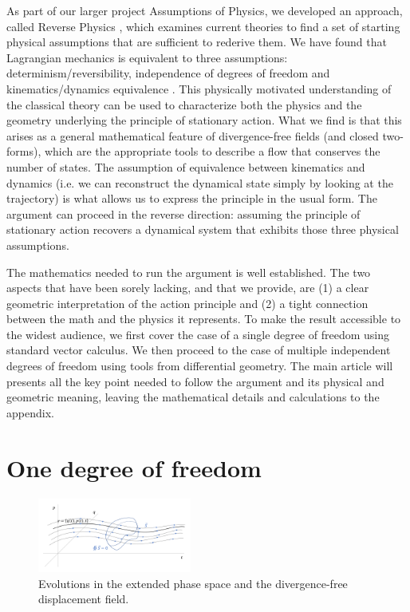 \documentclass[10pt,twocolumn, nofootinbib]{revtex4-2}
\begin{document}
As part of our larger project Assumptions of Physics, we developed an approach, called Reverse Physics \cite{aop-phys-ReversePhysics}, which examines current theories to find a set of starting physical assumptions that are sufficient to rederive them. We have found that Lagrangian mechanics is equivalent to three assumptions: determinism/reversibility, independence of degrees of freedom and kinematics/dynamics equivalence \cite{aop-phys-blueprint}. This physically motivated understanding of the classical theory can be used to characterize both the physics and the geometry underlying the principle of stationary action. What we find is that this arises as a general mathematical feature of divergence-free fields (and closed two-forms), which are the appropriate tools to describe a flow that conserves the number of states. The assumption of equivalence between kinematics and dynamics (i.e. we can reconstruct the dynamical state simply by looking at the trajectory) is what allows us to express the principle in the usual form. The argument can proceed in the reverse direction: assuming the principle of stationary action recovers a dynamical system that exhibits those three physical assumptions.

The mathematics needed to run the argument is well established\cite{souriau1970structure, abraham1978foundations,arnold1989mathematical, marsden1999introduction}. The two aspects that have been sorely lacking, and that we provide, are (1) a clear geometric interpretation of the action principle and (2) a tight connection between the math and the physics it represents. To make the result accessible to the widest audience, we first cover the case of a single degree of freedom using standard vector calculus. We then proceed to the case of multiple independent degrees of freedom using tools from differential geometry. The main article will presents all the key point needed to follow the argument and its physical and geometric meaning, leaving the mathematical details and calculations to the appendix.

\section{One degree of freedom}

\begin{figure}
	\includegraphics[width = 0.45\textwidth]{ExtendedPhaseSpace}
	\caption{\footnotesize{Evolutions in the extended phase space and the divergence-free displacement field.}}\label{extended_phase_space}
\end{figure}
\end{document}
